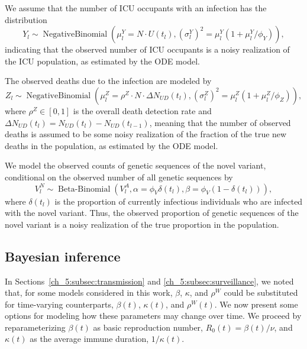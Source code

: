 We assume that the number of ICU occupants with an infection has the distribution
\begin{equation}
Y_l \sim \operatorname{Negative Binomial} \left( \mu^{Y}_l = N \cdot U \left( t_l \right), \left(\sigma^Y_l\right)^{2} = \mu^{Y}_l \left( 1 + \mu^{Y}_l / \phi_Y \right) \right),
\label{ch_5:eqn:icu_emission}
\end{equation}
indicating that the observed number of ICU occupants is a noisy realization of the ICU population, as estimated by the ODE model.

The observed deaths due to the infection are modeled by
\begin{equation}
Z_l \sim \operatorname{Negative Binomial} \left( \mu^{Z}_l = \rho^Z \cdot N \cdot \Delta N_{UD} \left( t_l \right), \left(\sigma^Z_l\right)^{2} = \mu^{Z}_l \left( 1 + \mu^{Z}_l / \phi_Z \right) \right),
\label{ch_5:eqn:death_emission}
\end{equation}
where \( \rho^Z \in [0,1]\) is the overall death detection rate and \( \Delta N_{UD}(t_l) = N_{UD}(t_l) - N_{UD}(t_{l-1}) \), meaning that the number of observed deaths is assumed to be some noisy realization of the fraction of the true new deaths in the population, as estimated by the ODE model.

We model the observed counts of genetic sequences of the novel variant, conditional on the observed number of all genetic sequences by
\begin{equation}
V^N_l \sim \operatorname{Beta-Binomial} \left( V^A_l, \alpha = \phi_V \delta \left( t_l \right), \beta = \phi_V \left( 1 -  \delta \left( t_l \right) \right) \right),
\label{ch_5:eqn:novel_variant_emission}
\end{equation}
where \( \delta \left( t_l \right) \) is the proportion of currently infectious individuals who are infected with the novel variant.
Thus, the observed proportion of genetic sequences of the novel variant is a noisy realization of the true proportion in the population.

\subsection{Bayesian inference}
\label{ch_5:subsec:bayesian}

In Sections~\ref{ch_5:subsec:transmission} and \ref{ch_5:subsec:surveillance}, we noted that, for some models considered in this work, \( \beta \), \( \kappa \), and \( \rho^W \) could be substituted for time-varying counterparts, \( \beta(t) \), \( \kappa(t) \), and \( \rho^W(t) \).
We now present some options for modeling how these parameters may change over time.
We proceed by reparameterizing \( \beta(t) \) as  basic reproduction number, \( R_0(t) = \beta(t) / \nu \), and \( \kappa(t) \) as the average immune duration, \( 1 / \kappa(t) \).

